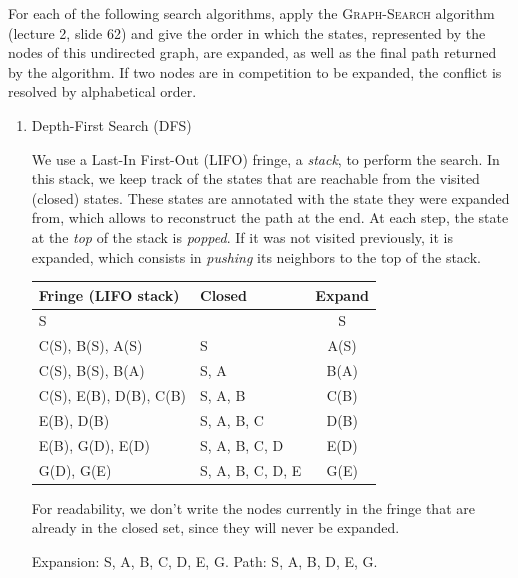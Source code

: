 \documentclass[11pt, a4paper]{article}
\begin{document}
For each of the following search algorithms, apply the \textsc{Graph-Search} algorithm (lecture 2, slide 62) and give the order in which the states, represented by the nodes of this undirected graph, are expanded, as well as the final path returned by the algorithm. If two nodes are in competition to be expanded, the conflict is resolved by alphabetical order.

\begin{enumerate}
    \item Depth-First Search (DFS)
    
    \begin{solution}
        We use a Last-In First-Out (LIFO) fringe, \ie{} a \emph{stack}, to perform the search. In this stack, we keep track of the states that are reachable from the visited (closed) states. These states are annotated with the state they were expanded from, which allows to reconstruct the path at the end. At each step, the state at the \emph{top} of the stack is \emph{popped}. If it was not visited previously, it is expanded, which consists in \emph{pushing} its neighbors to the top of the stack.
        
        \begin{table}[h]
            \centering
            \begin{tabular}{l|l|c}
                \toprule
                Fringe (LIFO stack) & Closed & Expand \\
                \midrule
                S & & S \\
                C(S), B(S), A(S) & S & A(S) \\
                C(S), B(S), B(A) & S, A & B(A) \\
                C(S), E(B), D(B), C(B) & S, A, B & C(B) \\
                E(B), D(B) & S, A, B, C & D(B) \\
                E(B), G(D), E(D) & S, A, B, C, D & E(D) \\
                G(D), G(E) & S, A, B, C, D, E & G(E) \\
                \bottomrule
            \end{tabular}
        \end{table}
        
        For readability, we don't write the nodes currently in the fringe that are already in the closed set, since they will never be expanded.
        
        Expansion: S, A, B, C, D, E, G. Path: S, A, B, D, E, G.
    \end{solution}
    

\end{enumerate}
\end{document}
